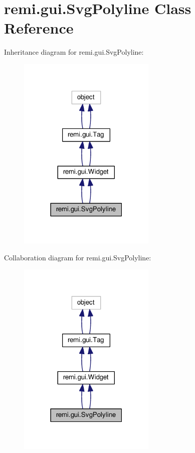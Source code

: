\hypertarget{classremi_1_1gui_1_1SvgPolyline}{}\section{remi.\+gui.\+Svg\+Polyline Class Reference}
\label{classremi_1_1gui_1_1SvgPolyline}


Inheritance diagram for remi.\+gui.\+Svg\+Polyline\+:
\nopagebreak
\begin{figure}[H]
\begin{center}
\leavevmode
\includegraphics[width=186pt]{d8/de4/classremi_1_1gui_1_1SvgPolyline__inherit__graph}
\end{center}
\end{figure}


Collaboration diagram for remi.\+gui.\+Svg\+Polyline\+:
\nopagebreak
\begin{figure}[H]
\begin{center}
\leavevmode
\includegraphics[width=186pt]{da/de3/classremi_1_1gui_1_1SvgPolyline__coll__graph}
\end{center}
\end{figure}
